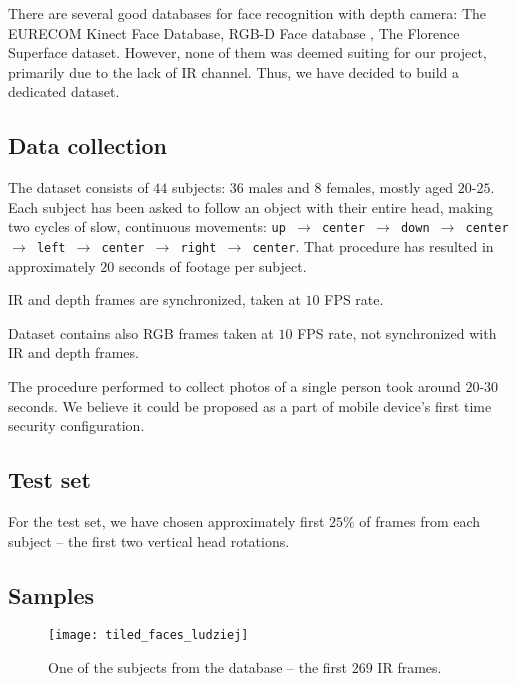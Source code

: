     There are several good databases for face recognition with depth camera:
    The EURECOM Kinect Face Database\cite{eurecom},
    RGB-D Face database \cite{vapaaudk},
    The Florence Superface dataset\cite{superface}. However, none of them was
    deemed suiting for our project, primarily due to the lack of IR channel.
    Thus, we have decided to build a dedicated dataset.

    \subsection*{Data collection}
    The dataset consists of $44$ subjects: $36$ males and
    $8$ females, mostly aged $20$-$25$. Each subject has been asked to
    follow an object with their entire head, making two cycles of slow,
    continuous movements: \texttt{up $\to$ center $\to$ down $\to$ center $\to$
    left $\to$ center $\to$ right $\to$ center}.
    That procedure has resulted in approximately $20$ seconds of footage per
    subject.

    IR and depth frames are synchronized, taken at $10$ FPS rate.

    Dataset contains also RGB frames taken at $10$ FPS rate, not synchronized
    with IR and depth frames.

    The procedure performed to collect photos of a single person took around $20$-$30$ seconds.
    We believe it could be proposed as a part of mobile device's first time security configuration.

    \subsection*{Test set}
    For the test set, we have chosen approximately first $25\%$ of
    frames from each subject -- the first two vertical head rotations.

    \subsection*{Samples}
    \begin{figure}[H]
    \caption{One of the subjects from the database -- the first $269$ IR frames.}
    \centering
    \texttt{[image: tiled\_faces\_ludziej]}
    \end{figure}

